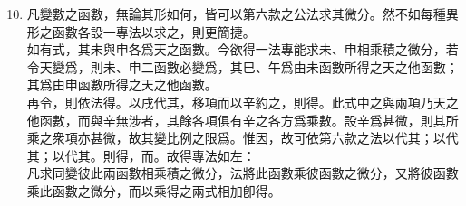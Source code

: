 \begin{enumerate} [label={第\chinese*款}]
	\setcounter{enumi}{9}
	\item 凡變數之函數，無論其形如何，皆可以第六款之公法求其微分。然不如每種異形之函數各設一專法以求之，則更簡捷。\\
	如有式\CJKmove，其未與申各爲天之函數。今欲得一法專能求未、申相乘積之微分，若令天變爲\CJKmove，則未、申二函數必變爲\CJKmove，其巳、午爲由未函數所得之天之他函數；其\CJKmove 爲由申函數所得之天之他函數。\\
	再令\CJKmove，則依法得\CJKmove。以戌代其\CJKmove，移項而以辛約之，則得\CJKmove。此式中之\CJKmove 與\CJKmove 兩項乃天之他函數，而與辛無涉者，其餘各項俱有辛之各方爲乘數。設辛爲甚微，則其所乘之衆項亦甚微，故其變比例之限爲\CJKmove。惟因\CJKmove，故可依第六款之法以\CJKmove 代其\CJKmove；以\CJKmove 代其\CJKmove；以\CJKmove 代其\CJKmove。則得\CJKmove，而\CJKmove。故得專法如左：\\
	凡求同變彼此兩函數相乘積之微分，法將此函數乘彼函數之微分，又將彼函數乘此函數之微分，而以乘得之兩式相加卽得。
\end{enumerate}

